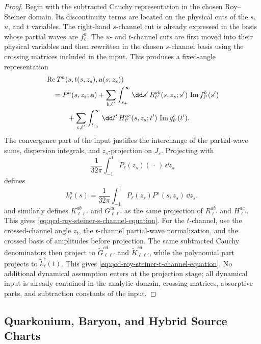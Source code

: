 \begin{proof}
Begin with the subtracted Cauchy representation in the chosen
Roy--Steiner domain.  Its discontinuity terms are located on the physical
cuts of the \(s\), \(u\), and \(t\) variables.  The right-hand \(s\)-channel
cut is already expressed in the basis whose partial waves are
\(f_\ell^a\).  The \(u\)- and \(t\)-channel cuts are first moved into their
physical variables and then rewritten in the chosen \(s\)-channel basis using
the crossing matrices included in the input.  This produces a fixed-angle
representation
\[
\begin{aligned}
  &\operatorname{Re}T^a(s,t(s,z_s),u(s,z_s))
  \\
  &\quad =
  P^a(s,z_s;\mathbf a)
  +\sum_{b,\ell'}\int_{s_+}^{\infty}\dd s'\,
    R_{\ell'}^{ab}(s,z_s;s')\,\operatorname{Im}f_{\ell'}^b(s')
  \\
  &\qquad\quad
  +\sum_{c,\ell'}\int_{t_{\rm th}}^{\infty}\dd t'\,
    H_{\ell'}^{ac}(s,z_s;t')\,\operatorname{Im}g_{\ell'}^c(t').
\end{aligned}
\]
The convergence part of the input justifies the interchange of the
partial-wave sums, dispersion integrals, and \(z_s\)-projection on \(J_s\).
Projecting with
\[
  \frac1{32\pi}\int_{-1}^{1}P_\ell(z_s)(\,\cdot\,)\,\dd z_s
\]
defines
\[
  k_\ell^a(s)=\frac1{32\pi}\int_{-1}^{1}P_\ell(z_s)P^a(s,z_s)\,\dd z_s,
\]
and similarly defines \(K_{\ell\ell'}^{ab}\) and
\(G_{\ell\ell'}^{ac}\) as the same projection of \(R_{\ell'}^{ab}\) and
\(H_{\ell'}^{ac}\).  This gives
\eqref{eq:qcd-roy-steiner-s-channel-equation}.  For the \(t\)-channel, use
the crossed-channel angle \(z_t\), the \(t\)-channel partial-wave
normalization, and the crossed basis of amplitudes before projection.  The
same subtracted Cauchy denominators then project to
\(\widetilde G_{\ell\ell'}^{cd}\) and
\(\widetilde K_{\ell\ell'}^{cd}\), while the polynomial part projects to
\(\widetilde k_\ell^c(t)\).  This gives
\eqref{eq:qcd-roy-steiner-t-channel-equation}.  No
additional dynamical assumption enters at the projection stage; all dynamical
input is already contained in the analytic domain, crossing matrices,
absorptive parts, and subtraction constants of the input.
\end{proof}

\subsection{Quarkonium, Baryon, and Hybrid Source Charts}
\label{subsec:qcd-quarkonium-baryon-hybrid-charts}

